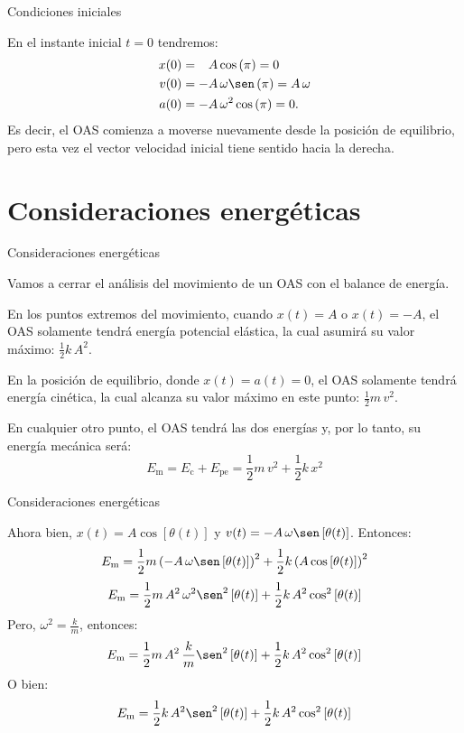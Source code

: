 \documentclass[11pt,handout,aspectratio=1610]{beamer}
\begin{document}
\begin{frame}{Condiciones iniciales}

    En el instante inicial $t = 0$ tendremos:
    \begin{align*}
        x (0) &= \phantom{+} A \cos \left(\pi\right) = 0 \\
        v (0) &= - A \, \omega \sen \left(\pi\right) = A \, \omega \\
        a (0) &= - A \, \omega^2 \cos \left(\pi\right) = 0. 
    \end{align*} Es decir, el OAS comienza a moverse nuevamente desde la posición de equilibrio, pero esta vez el vector velocidad inicial tiene sentido hacia la derecha.

\end{frame}

\section{Con\-si\-de\-ra\-cio\-nes energéticas}

\begin{frame}{Consideraciones energéticas}

    Vamos a cerrar el análisis del movimiento de un OAS con el balance de energía.

    \vspace{11pt}

    En los puntos extremos del movimiento, cuando $x(t) = A$ o $x(t) = -A$, el OAS solamente tendrá energía potencial elástica, la cual asumirá su valor máximo: $\frac{1}{2} k \, A^2$.

    \vspace{11pt}

    En la posición de equilibrio, donde $x(t) = a(t) = 0$, el OAS solamente tendrá energía cinética, la cual alcanza su valor máximo en este punto: $\frac{1}{2} m \, v^2$.

    \vspace{11pt}

    En cualquier otro punto, el OAS tendrá las dos energías y, por lo tanto, su energía mecánica será: $$ E_\text{m} = E_\text{c} + E_\text{pe} = \frac{1}{2} m \, v^2 + \frac{1}{2} k \, x^2$$

\end{frame}

\begin{frame}{Consideraciones energéticas}

    Ahora bien, $x(t) = A \cos \left[\theta (t)\right]$ y $v(t) = - A \, \omega \sen \left[\theta (t)\right]$. Entonces: $$E_\text{m} = \frac{1}{2} m \left(- A \, \omega \sen \left[\theta (t)\right]\right)^2 + \frac{1}{2} k \left(A \cos \left[\theta (t)\right]\right)^2$$
    $$E_\text{m} = \frac{1}{2} m \, A^2 \, \omega^2 \sen^2 \left[\theta (t)\right] + \frac{1}{2} k \, A^2 \cos^2 \left[\theta (t)\right]$$ Pero, $\omega^2 = \frac{k}{m}$, entonces: $$E_\text{m} = \frac{1}{2} m \, A^2 \, \frac{k}{m} \sen^2 \left[\theta (t)\right] + \frac{1}{2} k \, A^2 \cos^2 \left[\theta (t)\right]$$ O bien: $$E_\text{m} = \frac{1}{2} k \, A^2 \sen^2 \left[\theta (t)\right] + \frac{1}{2} k \, A^2 \cos^2 \left[\theta (t)\right]$$

\end{frame}
\end{document}

